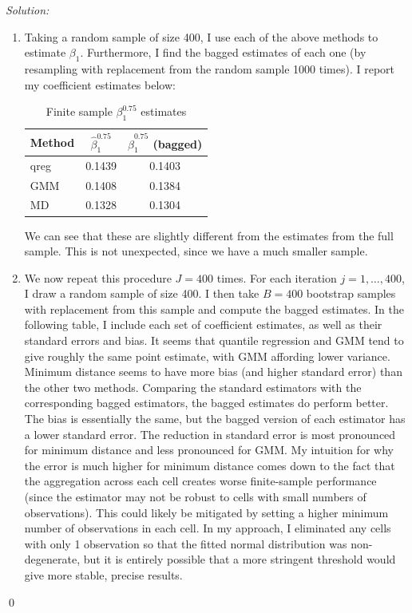 \documentclass[12pt]{article}
\newenvironment{sol}
    {\emph{Solution:}
    }
    {
    \qed
    }
\begin{document}
\begin{sol}
  \begin{enumerate}[label=\alph*) ]
    \item Taking a random sample of size 400, I use each of the above methods to estimate $\beta_1$. Furthermore, I find the bagged estimates of each one (by resampling with replacement from the random sample 1000 times). I report my coefficient estimates below:
    \begin{table}[htbp]
      \centering
      \caption{Finite sample $\beta_1^{0.75}$ estimates}
        \begin{tabular}{lcc}
            \toprule
              Method          & $\hat{\beta}_1^{0.75}$  & $\hat{\beta}_1^{0.75}$ (bagged)         \\
            \midrule
            qreg & 0.1439 & 0.1403\\
              GMM & 0.1408 & 0.1384\\
              MD & 0.1328 & 0.1304\\
            \bottomrule
        \end{tabular}
      \label{tab:bagged}
    \end{table}
    We can see that these are slightly different from the estimates from the full sample. This is not unexpected, since we have a much smaller sample. 
    \item We now repeat this procedure $J = 400$ times. For each iteration $j = 1, \ldots, 400$, I draw a random sample of size 400. I then take $B = 400$ bootstrap samples with replacement from this sample and compute the bagged estimates. In the following table, I include each set of coefficient estimates, as well as their standard errors and bias. It seems that quantile regression and GMM tend to give roughly the same point estimate, with GMM affording lower variance. Minimum distance seems to have more bias (and higher standard error) than the other two methods. Comparing the standard estimators with the corresponding bagged estimators, the bagged estimates do perform better. The bias is essentially the same, but the bagged version of each estimator has a lower standard error. The reduction in standard error is most pronounced for minimum distance and less pronounced for GMM. My intuition for why the error is much higher for minimum distance comes down to the fact that the aggregation across each cell creates worse finite-sample performance (since the estimator may not be robust to cells with small numbers of observations). This could likely be mitigated by setting a higher minimum number of observations in each cell. In my approach, I eliminated any cells with only 1 observation so that the fitted normal distribution was non-degenerate, but it is entirely possible that a more stringent threshold would give more stable, precise results. 

\end{enumerate}
\end{sol}
\end{document}
